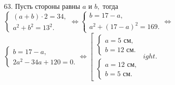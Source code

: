 63. Пусть стороны равны $a$ и $b,$ тогда $\begin{cases}(a+b)\cdot2=34,\\ a^2+b^2=13^2.\end{cases}\Leftrightarrow
\begin{cases}b=17-a,\\ a^2+(17-a)^2=169.\end{cases}\Leftrightarrow$\\$
\begin{cases}b=17-a,\\ 2a^2-34a+120=0.\end{cases}\Leftrightarrow
\left[\begin{array}{l}\begin{cases}a=5\text{ см},\\ b=12\text{ см}.\end{cases}\\ \begin{cases}a=12\text{ см},\\ b=5\text{ см}.\end{cases}\end{array}
ight.$\\
